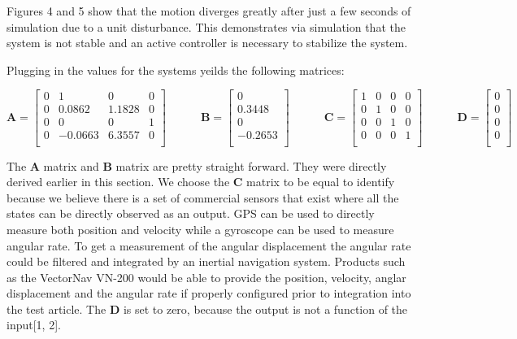 \documentclass[titlepage]{article}
\begin{document}
Figures 4 and 5 show that the motion diverges greatly after just a few seconds of simulation due to a unit disturbance. This demonstrates via simulation that the system is not stable and an active controller is necessary to stabilize the system.

Plugging in the values for the systems yeilds the following matrices:

\begin{equation}
	\textbf{A} = \begin{bmatrix}
		0 & 1 & 0 & 0\\
		0 & 0.0862 & 1.1828 & 0\\
		0 & 0 & 0 & 1\\
		0 & -0.0663 & 6.3557 & 0\\
		\end{bmatrix}
	\quad\quad\quad
	\textbf{B} = \begin{bmatrix}
		0 \\
		0.3448 \\
		0 \\
		-0.2653 \\
		\end{bmatrix}
	\quad\quad\quad
	\textbf{C} = \begin{bmatrix}
		1 & 0 & 0 & 0\\
		0 & 1 & 0 & 0\\
		0 & 0 & 1 & 0\\
		0 & 0 & 0 & 1\\
		\end{bmatrix}
	\quad\quad\quad
	\textbf{D} = \begin{bmatrix}
	0\\
	0\\
	0\\
	0\\
	\end{bmatrix}
\end{equation}

The \textbf{A} matrix and \textbf{B} matrix are pretty straight forward. They were directly derived earlier in this section. We choose the \textbf{C} matrix to be equal to identify because we believe there is a set of commercial sensors that exist where all the states can be directly observed as an output. GPS can be used to directly measure both position and velocity while a gyroscope can be used to measure angular rate. To get a measurement of the angular displacement the angular rate could be filtered and integrated by an inertial navigation system. Products such as the VectorNav VN-200 would be able to provide the position, velocity, anglar displacement and the angular rate if properly configured prior to integration into the test article. The \textbf{D} is set to zero, because the output is not a function of the input[1, 2].
\end{document}

